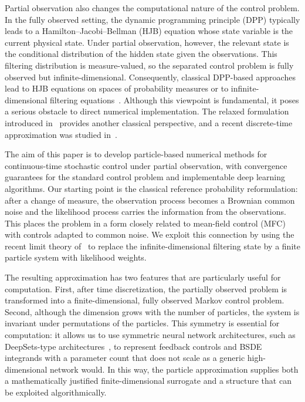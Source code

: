 \documentclass[11pt]{article}
\numberwithin{equation}{section}
\theoremstyle{plain}
\theoremstyle{definition}
\theoremstyle{remark}
\begin{document}
	Partial observation also changes the computational nature of the control problem. In the fully observed setting, the dynamic programming principle (DPP) typically leads to a Hamilton--Jacobi--Bellman (HJB) equation whose state variable is the current physical state. Under partial observation, however, the relevant state is the conditional distribution of the hidden state given the observations. This filtering distribution is measure-valued, so the separated control problem is fully observed but infinite-dimensional. Consequently, classical DPP-based approaches lead to HJB equations on spaces of probability measures or to infinite-dimensional filtering equations~\cite{fleming1980measure, lions1989viscosity, gozzi2000hamilton}. Although this viewpoint is fundamental, it poses a serious obstacle to direct numerical implementation. The relaxed formulation introduced in~\cite{el1988existence} provides another classical perspective, and a recent discrete-time approximation was studied in~\cite{li2024discrete}.
	
	The aim of this paper is to develop particle-based numerical methods for continuous-time stochastic control under partial observation, with convergence guarantees for the standard control problem and implementable deep learning algorithms. Our starting point is the classical reference probability reformulation: after a change of measure, the observation process becomes a Brownian common noise and the likelihood process carries the information from the observations. This places the problem in a form closely related to mean-field control (MFC) with controls adapted to common noise. We exploit this connection by using the recent limit theory of~\cite{bouchard2025limit} to replace the infinite-dimensional filtering state by a finite particle system with likelihood weights.
	
	The resulting approximation has two features that are particularly useful for computation. First, after time discretization, the partially observed problem is transformed into a finite-dimensional, fully observed Markov control problem. Second, although the dimension grows with the number of particles, the system is invariant under permutations of the particles. This symmetry is essential for computation: it allows us to use symmetric neural network architectures, such as DeepSets-type architectures~\cite{germain2022deepsets}, to represent feedback controls and BSDE integrands with a parameter count that does not scale as a generic high-dimensional network would. In this way, the particle approximation supplies both a mathematically justified finite-dimensional surrogate and a structure that can be exploited algorithmically.
	
\end{document}
